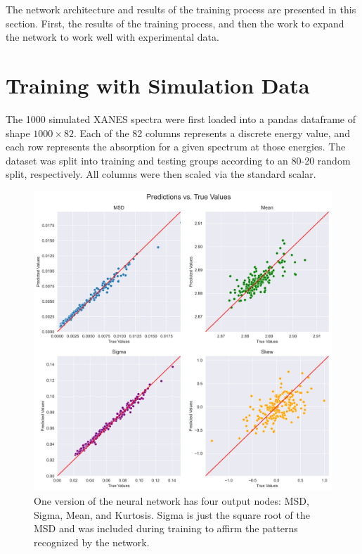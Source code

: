 The network architecture and results of the training process are presented in this section. First, the results of the training process, and then the work to expand the network to work well with experimental data.

\section{Training with Simulation Data}
The 1000 simulated XANES spectra were first loaded into a pandas dataframe \cite{pandas-1} \cite{pandas-2} of shape $ 1000\times82 $. Each of the 82 columns represents a discrete energy value, and each row represents the absorption for a given spectrum at those energies. The dataset was split into training and testing groups according to an 80-20 random split, respectively. All columns were then scaled via the standard scalar.

\begin{figure}
    \centering
    \includegraphics[width=\linewidth]{Chapters/Figures/pa_train-test (3).png}
    \caption{One version of the neural network has four output nodes: MSD, Sigma, Mean, and Kurtosis. Sigma is just the square root of the MSD and was included during training to affirm the patterns recognized by the network.}
    \label{fig:train-test-split-all4}
\end{figure}

